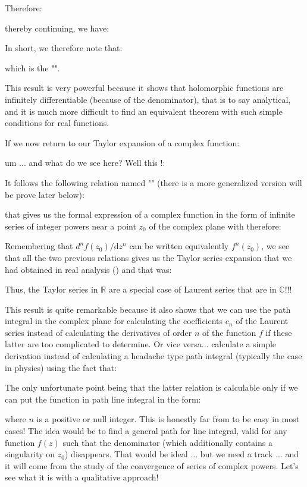 	Therefore:
	
	thereby continuing, we have:
	
	In short, we therefore note that:
	
	which is the "".
	
	This result is very powerful because it shows that holomorphic functions are infinitely differentiable (because of the denominator), that is to say analytical, and it is much more difficult to find an equivalent theorem with such simple conditions for real functions.
	
	If we now return to our Taylor expansion of a complex function:
	
	um ... and what do we see here? Well this !:
	
	It follows the following relation named "" (there is a more generalized version will be prove later below):
	
	that gives us the formal expression of a complex function in the form of infinite series of integer powers near a point $z_0$ of the complex plane with therefore:
	
	Remembering that $d^{n}f(z_0)/\mathrm{d}z^n$ can be written equivalently $f^n(z_0)$, we see that all the two previous relations gives us the Taylor series expansion that we had obtained in real analysis () and that was:
	
	Thus, the Taylor series in $\mathbb{R}$ are a special case of Laurent series that are in $\mathbb{C}$!!!
	
	This result is quite remarkable because it also shows that we can use the path integral in the complex plane for calculating the coefficients $c_n$ of the Laurent series instead of calculating the derivatives of order $n$ of the function $f$ if these latter are too complicated to determine. Or vice versa... calculate a simple derivation instead of calculating a headache type path integral (typically the case in physics) using the fact that:
	
	The only unfortunate point being that the latter relation is calculable only if we can put the function in path line integral in the form:
	
	where $n$ is a positive or null integer. This is honestly far from to be easy in most cases! The idea would be to find a general path for line integral, valid for any function $f (z)$ such that the denominator (which additionally contains a singularity on $z_0$) disappears. That would be ideal ... but we need a track ... and it will come from the study of the convergence of series of complex powers. Let's see what it is with a qualitative approach!
	
